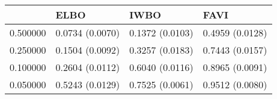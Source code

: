 \begin{tabular}{llll}
\toprule
 & ELBO & IWBO & FAVI \\
\midrule
0.500000 & 0.0734 (0.0070) & 0.1372 (0.0103) & 0.4959 (0.0128) \\
0.250000 & 0.1504 (0.0092) & 0.3257 (0.0183) & 0.7443 (0.0157) \\
0.100000 & 0.2604 (0.0112) & 0.6040 (0.0116) & 0.8965 (0.0091) \\
0.050000 & 0.5243 (0.0129) & 0.7525 (0.0061) & 0.9512 (0.0080) \\
\bottomrule
\end{tabular}
